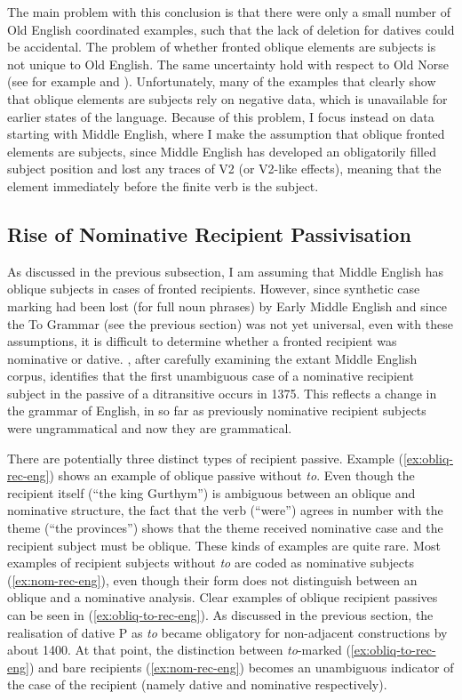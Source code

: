 	The main problem with this conclusion is that there were only a small number of Old English coordinated examples, such that the lack of deletion for datives could be accidental. The problem of whether fronted oblique elements are subjects is not unique to Old English. The same uncertainty hold with respect to Old Norse (see for example \citealt{Kristoffersen.1991,Kristoffersen.1994} and \citealt{Bardal.2001b}). Unfortunately, many of the examples that clearly show that oblique elements are subjects rely on negative data, which is unavailable for earlier states of the language. Because of this problem, I focus instead on data starting with Middle English, where I make the assumption that oblique fronted elements are subjects, since Middle English has developed an obligatorily filled subject position and lost any traces of V2 (or V2-like effects), meaning that the element immediately before the finite verb is the subject.

	\subsection{Rise of Nominative Recipient Passivisation}\label{sec:eng-to-pass}

	As discussed in the previous subsection, I am assuming that Middle English has oblique subjects in cases of fronted recipients. However, since synthetic case marking had been lost (for full noun phrases) by Early Middle English and since the To Grammar (see the previous section) was not yet universal, even with these assumptions, it is difficult to determine whether a fronted recipient was nominative or dative. \cite{Allen.1999}, after carefully examining the extant Middle English corpus, identifies that the first unambiguous case of a nominative recipient subject in the passive of a ditransitive occurs in 1375. This reflects a change in the grammar of English, in so far as previously nominative recipient subjects were ungrammatical and now they are grammatical.

	There are potentially three distinct types of recipient passive. Example (\ref{ex:obliq-rec-eng}) shows an example of oblique passive without \textit{to}. Even though the recipient itself (``the king Gurthym'') is ambiguous between an oblique and nominative structure, the fact that the verb (``were'') agrees in number with the theme (``the provinces'') shows that the theme received nominative case and the recipient subject must be oblique. These kinds of examples are quite rare. Most examples of recipient subjects without \textit{to} are coded as nominative subjects (\ref{ex:nom-rec-eng}), even though their form does not distinguish between an oblique and a nominative analysis. Clear examples of oblique recipient passives can be seen in (\ref{ex:obliq-to-rec-eng}). As discussed in the previous section, the realisation of dative P as \textit{to} became obligatory for non-adjacent constructions by about 1400. At that point, the distinction between \textit{to}-marked (\ref{ex:obliq-to-rec-eng}) and bare recipients (\ref{ex:nom-rec-eng}) becomes an unambiguous indicator of the case of the recipient (namely dative and nominative respectively).

